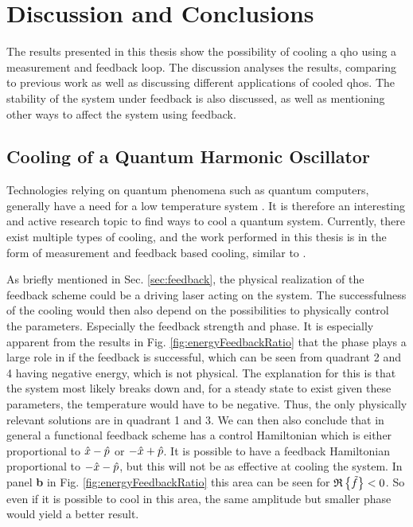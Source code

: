 \section{Discussion and Conclusions}
The results presented in this thesis show the possibility of cooling a \gls{qho} using a measurement and feedback loop. The discussion analyses the results, comparing to previous work as well as discussing different applications of cooled \gls{qho}s. The stability of the system under feedback is also discussed, as well as mentioning other ways to affect the system using feedback. 

\subsection{Cooling of a Quantum Harmonic Oscillator}
Technologies relying on quantum phenomena such as quantum computers, generally have a need for a low temperature system \cite{Nielsen:2010}. It is therefore an interesting and active research topic to find ways to cool a quantum system. Currently, there exist multiple types of cooling, and the work performed in this thesis is in the form of measurement and feedback based cooling, similar to \cite{De-Sousa:2025}.

As briefly mentioned in Sec. \ref{sec:feedback}, the physical realization of the feedback scheme could be a driving laser acting on the system. The successfulness of the cooling would then also depend on the possibilities to physically control the parameters. Especially the feedback strength and phase. It is especially apparent from the results in Fig. \ref{fig:energyFeedbackRatio} that the phase plays a large role in if the feedback is successful, which can be seen from quadrant 2 and 4 having negative energy, which is not physical. The explanation for this is that the system most likely breaks down and, for a steady state to exist given these parameters, the temperature would have to be negative. Thus, the only physically relevant solutions are in quadrant 1 and 3. We can then also conclude that in general a functional feedback scheme has a control Hamiltonian which is either proportional to $\hat{x} - \hat{p}$ or $-\hat{x} + \hat{p}$. It is possible to have a feedback Hamiltonian proportional to $-\hat{x} - \hat{p}$, but this will not be as effective at cooling the system. In panel \textbf{b} in Fig. \ref{fig:energyFeedbackRatio} this area can be seen for $\mathfrak{R}\left\{\tilde{f}\right\} < 0$. So even if it is possible to cool in this area, the same amplitude but smaller phase would yield a better result.

